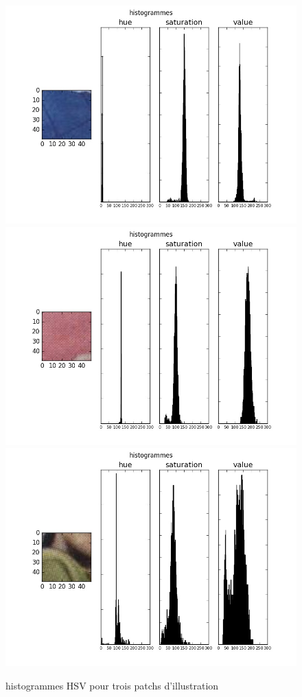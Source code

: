 \documentclass{book}
\begin{document}
\begin{figure}[H]
\begin{center}
\includegraphics[scale=0.3]{images/histo_hsv_image.jpg}
\includegraphics[scale=0.3]{images/histo_hsv_image2.jpg}
\includegraphics[scale=0.3]{images/histo_hsv_image3.jpg}
\end{center}
\caption{histogrammes HSV pour trois patchs d'illustration}
\label{histo_hsv_illustration}
\end{figure}
\end{document}

